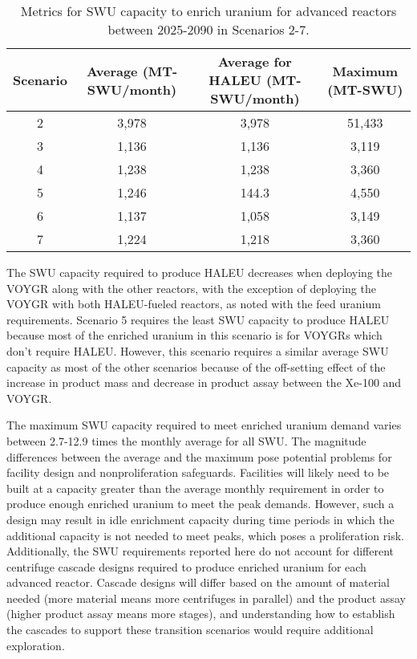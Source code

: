 \begin{table}[h!]
    \centering 
    \caption{Metrics for \gls{SWU} capacity to enrich uranium for 
    advanced reactors between 2025-2090 in Scenarios 2-7.}
    \label{tab:nogrowth_swu}
    \begin{tabular}{c c c c}
        \hline
        Scenario & Average  (MT-SWU/month) & Average
        for \gls{HALEU} (MT-SWU/month) & Maximum (MT-SWU)\\\hline
        2 & 3,978 & 3,978 & 51,433 \\
        3 & 1,136 & 1,136 & 3,119\\
        4 & 1,238 & 1,238 & 3,360\\
        5 & 1,246 & 144.3 & 4,550 \\
        6 & 1,137 & 1,058 & 3,149\\
        7 & 1,224 & 1,218 & 3,360\\
        \hline
    \end{tabular}
\end{table}

The \gls{SWU} capacity required to produce \gls{HALEU} decreases when 
deploying the VOYGR along with the other reactors, with the exception 
of deploying the VOYGR with both \gls{HALEU}-fueled reactors, as noted 
with the feed uranium requirements. 
Scenario 5 requires the least \gls{SWU} capacity to produce 
\gls{HALEU} because most of the enriched uranium in this 
scenario is for VOYGRs which don't require \gls{HALEU}. However, this 
scenario requires a similar average \gls{SWU} capacity as most of the other 
scenarios because of the off-setting effect of the increase in product mass 
and decrease in product assay between the Xe-100 and VOYGR. 

The maximum \gls{SWU} capacity required to meet enriched uranium demand 
varies between 2.7-12.9 times the monthly average for all \gls{SWU}. 
The magnitude differences between the average and the maximum pose potential 
problems for facility design and nonproliferation safeguards. Facilities 
will likely need to be built at a capacity greater than the average 
monthly requirement in order to produce enough enriched uranium to meet 
the peak demands. However, such a design may result in idle enrichment 
capacity during time periods in which the additional capacity is 
not needed to meet peaks, which poses a proliferation risk. Additionally, 
the \gls{SWU} requirements reported here do not account for different 
centrifuge cascade designs required to produce enriched uranium for 
each advanced reactor. Cascade designs will differ based on 
the amount of material needed (more material means more centrifuges in 
parallel) and the product assay (higher product assay means more stages), 
and understanding how to establish the cascades to support these transition 
scenarios would require additional exploration. 

